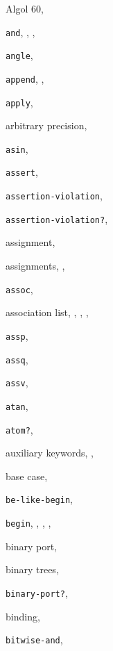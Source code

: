 {\begin{multicols}{2}
Algol 60, \pageref{intro_s27}
  
\texttt{and}, \pageref{start_s108}, \pageref{further_s22}, \textit{\pageref{control_s11}}
  
\texttt{angle}, \textit{\pageref{objects_s124}}
  
\texttt{append}, \pageref{start_s151}, \textit{\pageref{objects_s49}}
  
\texttt{apply}, \textit{\pageref{control_s3}}
  
arbitrary precision, \pageref{objects_s76}
  
\texttt{asin}, \textit{\pageref{objects_s132}}
  
\texttt{assert}, \textit{\pageref{exceptions_s5}}
  
\texttt{assertion-violation}, \textit{\pageref{exceptions_s4}}
  
\texttt{assertion-violation?}, \textit{\pageref{exceptions_s21}}
  
assignment, \pageref{binding_s29}
  
assignments, \pageref{start_s163}, \pageref{binding_s30}
  
\texttt{assoc}, \textit{\pageref{objects_s58}}
  
association list, \pageref{objects_s59}, \pageref{objects_s61}, \pageref{objects_s273}, \pageref{examples_s50}
  
\texttt{assp}, \textit{\pageref{objects_s60}}
  
\texttt{assq}, \textit{\pageref{objects_s58}}
  
\texttt{assv}, \textit{\pageref{objects_s58}}
  
\texttt{atan}, \textit{\pageref{objects_s133}}
  
\texttt{atom?}, \pageref{start_s127}
  
auxiliary keywords, \pageref{further_s16}, \pageref{syntax_s22}
  
base case, \pageref{start_s134}
  
\texttt{be-like-begin}, \pageref{syntax_s54}
  
\texttt{begin}, \pageref{start_s174}, \pageref{further_s10}, \pageref{binding_s26}, \textit{\pageref{control_s4}}
  
binary port, \pageref{io_s6}
  
binary trees, \pageref{objects_s33}
  
\texttt{binary-port?}, \textit{\pageref{io_s45}}
  
binding, \pageref{intro_s14}
  
\texttt{bitwise-and}, \textit{\pageref{objects_s134}}
  

\end{multicols}}
